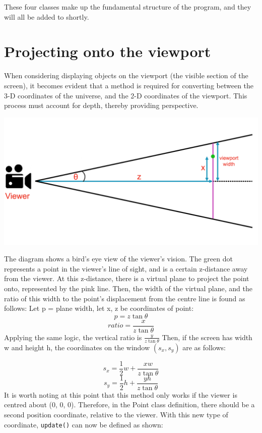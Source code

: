 \documentclass{article}
\begin{document}
These four classes make up the fundamental structure of the program, and they will all be added to shortly.

\newpage
\section{Projecting onto the viewport}
When considering displaying objects on the viewport (the visible section of the screen), it becomes evident that a method is required for converting between the 3-D coordinates of the universe, and the 2-D coordinates of the viewport. This process must account for depth, thereby providing perspective.

\includegraphics[width=1\textwidth]{projection_diagram.png}

The diagram shows a bird's eye view of the viewer's vision. The green dot represents a point in the viewer's line of sight, and is a certain z-distance away from the viewer. At this z-distance, there is a virtual plane to project the point onto, represented by the pink line. 
\newline
\newline
Then, the width of the virtual plane, and the ratio of this width to the point's displacement from the centre line is found as follows:
\newline
\newline
Let p = plane width, let x, z be coordinates of point:
$$ p = z\tan{\theta} $$
$$ ratio = \frac{x}{z\tan{\theta}} $$
Applying the same logic, the vertical ratio is $ \frac{y}{z\tan{\theta}} $
\newline
\newline
Then, if the screen has width w and height h, the coordinates on the window $(s_x, s_y) $ are as follows:

$$ s_x = \frac{1}{2}w + \frac{xw}{z\tan{\theta}} $$
$$ s_y = \frac{1}{2}h + \frac{yh}{z\tan{\theta}} $$
\newpage
It is worth noting at this point that this method only works if the viewer is centred about (0, 0, 0). Therefore, in the Point class definition, there should be a second position coordinate, relative to the viewer. With this new type of coordinate, \verb|update()| can now be defined as shown:
\end{document}
